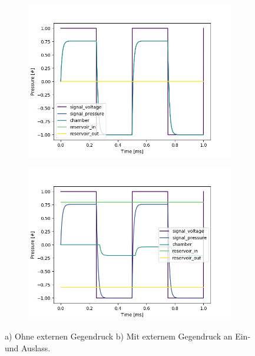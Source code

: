 \documentclass[fontsize=12pt, a4paper]{scrartcl}
\begin{document}
\begin{figure}[H]
    \centering
    \begin{subfigure}[H]{0.48\textwidth}
        \includegraphics[width=\textwidth, valign=t]{bilder/backpressure/backpressure_free.png}
    \end{subfigure}
    \begin{subfigure}[H]{0.48\textwidth}
        \includegraphics[width=\textwidth, valign=t]{bilder/backpressure/backpressure_example.png}
    \end{subfigure}
    \caption{a) Ohne externen Gegendruck b) Mit externem Gegendruck an Ein- und Auslass.}
\end{figure}
\end{document}
